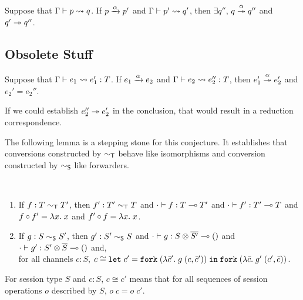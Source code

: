 \begin{conjecture}
  Suppose that $\Ptranslation {p}{q}$.
  If $\reduce[\alpha]{p}{p'}$
  and $\Ptranslation{p'}{q'}$,
  then $\exists q''$,  $\reducemany[\alpha]{q}{q''}$
  and $ \reducemany{q'}{ q''}$.
\end{conjecture}


\subsection{Obsolete Stuff}
\label{sec:obsolete-stuff}



\begin{conjecture}[obsolete]
  Suppose that $\translation {e_1}{e_1'} T$.
  If $\reduce[\alpha]{e_1}{e_2}$
  and $\translation{e_2}{e_2''}{T}$,
  then $\reducemany[\alpha]{e_1'}{e_2'}$
  and $e_2' = e_2''$.
\end{conjecture}
If we could establish $\reducemany{e_2''}{e_2'}$ in  the
conclusion, that would result in a reduction correspondence.

The following lemma is a stepping stone for this conjecture. It
establishes that conversions constructed by $\eqt$ behave like
isomorphisms and conversion constructed by $\eqs$ like forwarders.
\begin{conjecture}~\\[-\baselineskip]
  \label{lemma:conversion}
  \begin{enumerate}
  \item If $f : T \eqt T'$,
    then $f' : T' \eqt T$
    and $\typing[\CNil]{f}{\TFun T{T'}}$
    and  $\typing[\CNil]{f'}{\TFun {T'}T}$
    and  $f \circ f' = \ELam x x$
    and  $f' \circ f = \ELam x x$.
  \item If $g : S \eqs S'$,
    then $g' : S' \eqs S$
    and $\typing[\CNil]{g}{\TFun {\TPair {S} {\TDual{S'}}} \TUnit}$
    and $\typing[\CNil]{g'}{\TFun {\TPair {S'} {\TDual{S}}} \TUnit}$
    and,\\
    for all channels $c : S$,  $c \cong \ELet{c'}{\EFork{( \ELam {\bar c'} g \; (c, \bar c')) }}{\EFork{( \ELam {\bar c} g' \; (c', \bar c)) }} $.
  \end{enumerate}
\end{conjecture}
For session type $S$ and $c:S$, $c \cong c'$ means that for all
sequences of session operations $o$ described by $S$, $o\; c = o\; c'$.


